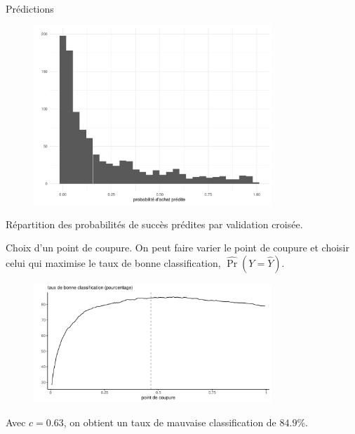 \documentclass[
  ignorenonframetext,
]{beamer}
\begin{document}
\begin{frame}{Prédictions}
\protect\hypertarget{pruxe9dictions}{}
\begin{figure}

{\centering \includegraphics[width=0.8\textwidth,height=\textheight]{MATH60602-diapos6_files/figure-beamer/figclassification0-1.pdf}

}

\end{figure}

\footnotesize

Répartition des probabilités de succès prédites par validation croisée.

\normalsize
\end{frame}

\begin{frame}{Choix d'un point de coupure.}
\protect\hypertarget{choix-dun-point-de-coupure.}{}
On peut faire varier le point de coupure et choisir celui qui maximise
le taux de bonne classification, \(\widehat{\Pr}(Y = \widehat{Y})\).

\begin{figure}

{\centering \includegraphics[width=0.8\textwidth,height=\textheight]{MATH60602-diapos6_files/figure-beamer/unnamed-chunk-4-1.pdf}

}

\end{figure}

Avec \(c=0.63\), on obtient un taux de mauvaise classification de
\(84.9\)\%.
\end{frame}
\end{document}
